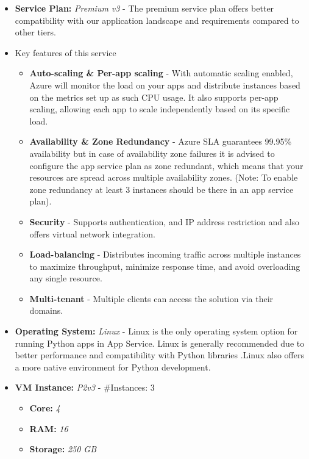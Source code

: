 \documentclass{llncs}
\begin{document}
\begin{itemize}
    \item \textbf{Service Plan:} \textit{Premium v3} - The premium service plan offers better compatibility with our application landscape and requirements compared to other tiers.
    \item Key features of this service
          \begin{itemize}
              \item \textbf{Auto-scaling \& Per-app scaling} - With automatic scaling enabled, Azure will monitor the load on your apps and distribute instances based on the metrics set up as such CPU usage. It also supports per-app scaling, allowing each app to scale independently based on its specific load.
              \item \textbf{Availability \& Zone Redundancy} - Azure SLA guarantees 99.95\% availability but in case of availability zone failures it is advised to configure the app service plan as zone redundant, which means that your resources are spread across multiple availability zones. (Note: To enable zone redundancy at least 3 instances should be there in an app service plan).
              \item \textbf{Security} - Supports authentication, and IP address restriction and also offers virtual network integration.
              \item \textbf{Load-balancing} - Distributes incoming traffic across multiple instances to maximize throughput, minimize response time, and avoid overloading any single resource.
              \item \textbf{Multi-tenant} - Multiple clients can access the solution via their domains.
          \end{itemize}

    \item \textbf{Operating System:} \textit{Linux} - Linux is the only operating system option for running Python apps in App Service. Linux is generally recommended due to better performance and compatibility with Python libraries
          .Linux also offers a more native environment for Python development\cite{MicrosoftAzurePythonConfig}.

    \item \textbf{VM Instance:} \textit{P2v3} - \#Instances: 3

          \begin{itemize}
              \item \textbf{Core:} \textit{4}
              \item \textbf{RAM:} \textit{16}
              \item \textbf{Storage:} \textit{250 GB}
          \end{itemize}
\end{itemize}
\end{document}
